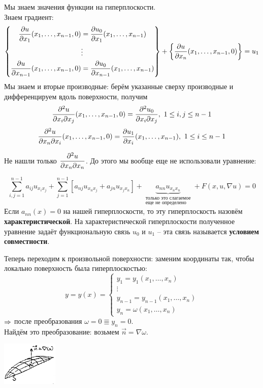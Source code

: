 \documentclass[../main.tex]{subfiles}
\begin{document}
Мы знаем значения функции на гиперплоскости.\\
Знаем градиент:
\begin{equation*}
\left\{\begin{aligned}
\frac{\partial u}{\partial x_1}(x_1, \dots, x_{n-1}, 0) &= \frac{\partial u_0}{\partial x_1}(x_1, \dots, x_{n-1})\\ 
&\vdots \\
\frac{\partial u}{\partial x_{n-1}}(x_1, \dots, x_{n-1}, 0) &= \frac{\partial u_0}{\partial x_{n-1}}(x_1, \dots, x_{n-1})
\end{aligned} \right\}
+\left\{\frac{\partial u}{\partial x_n}(x_1,\dots,x_{n-1},0)\right\} = u_1
\end{equation*}
Мы знаем и вторые производные: берём указанные сверху производные и дифференцируем вдоль поверхности, получим \[\frac{\subd^2u}{\subd x_i\subd x_j}(x_1,\dots,x_{n-1}, 0) = \frac{\subd^2u_0}{\subd x_i\subd x_j},\ 1\le i,j \le n-1 \]
\[\frac{\partial^2u}{\partial x_n\partial x_i}(x_1,\dots,x_{n-1}, 0) = \frac{\partial u_1}{\partial x_i}(x_1,\dots,x_{n-1}),\ 1\le i\le n-1\]

Не нашли только $\displaystyle\frac{\partial^2 u}{\partial x_n\partial x_n}$. До этого мы вообще еще не использовали уравнение:

$$\displaystyle\sum\limits_{i,j=1}^{n-1}a_{ij}u_{x_ix_j} + \displaystyle\sum\limits_{j=1}^{n-1}\left[a_{nj}u_{x_nx_j} + a_{jn}u_{x_jx_n}\right] + \underbrace{a_{nn}u_{x_nx_n}}_{\substack{\text{только это слагаемое}\\ \text{еще не определено}}} + F(x, u, \nabla u) = 0 $$
Если $a_{nn}(x) = 0$ на нашей гиперплоскости, то эту гиперплоскость назовём {\bf характеристической}. На характеристической гиперплоскости полученное уравнение задаёт функциональную связь $u_0$ и $u_1$ -- эта связь называется {\bf условием совместности}.

Теперь переходим к произвольной поверхности: заменим координаты так, чтобы локально поверхность была гиперплоскостью:
\[y = y(x) = \begin{cases} y_1 = y_1(x_1,\dots, x_n) \\ \vdots \\ y_{n-1} = y_{n-1}(x_1,\dots,x_n) \\ y_n = \omega(x_1,\dots,x_n) \end{cases} \]
$\Rightarrow$ после преобразования $\omega=0 \Equiv y_n=0$.\\
Найдём это преобразование: возьмем $\vec{n} = \nabla \omega$.
\begin{center}
\includegraphics[width=0.2\textwidth]{./2_1_new}
\end{center}
\end{document}

